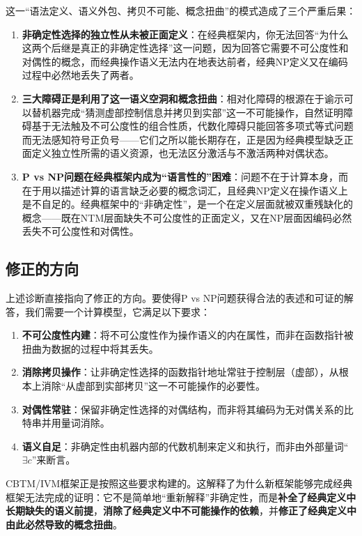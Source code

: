 \documentclass{ctexart}
\begin{document}
	这一``语法定义、语义外包、拷贝不可能、概念扭曲''的模式造成了三个严重后果：
	\begin{enumerate}
		\item \textbf{非确定性选择的独立性从未被正面定义}：在经典框架内，你无法回答``为什么这两个后继是真正的非确定性选择''这一问题，因为回答它需要不可公度性和对偶性的概念，而经典操作语义无法内在地表达前者，经典NP定义又在编码过程中必然地丢失了两者。
		\item \textbf{三大障碍正是利用了这一语义空洞和概念扭曲}：相对化障碍的根源在于谕示可以替机器完成“猜测虚部控制信息并拷贝到实部”这一不可能操作，自然证明障碍基于无法触及不可公度性的组合性质，代数化障碍只能回答多项式等式问题而无法感知符号正负号——它们之所以能长期存在，正是因为经典模型缺乏正面定义独立性所需的语义资源，也无法区分激活与不激活两种对偶状态。
		\item \textbf{P vs NP问题在经典框架内成为``语言性的''困难}：问题不在于计算本身，而在于用以描述计算的语言缺乏必要的概念词汇，且经典NP定义在操作语义上是不自足的。经典框架中的``非确定性''，是一个在定义层面就被双重残缺化的概念——既在NTM层面缺失不可公度性的正面定义，又在NP层面因编码必然丢失不可公度性和对偶性。
	\end{enumerate}
	
	\subsection{修正的方向}
	
	上述诊断直接指向了修正的方向。要使得P vs NP问题获得合法的表述和可证的解答，我们需要一个计算模型，它满足以下要求：
	\begin{enumerate}
		\item \textbf{不可公度性内建}：将不可公度性作为操作语义的内在属性，而非在函数指针被扭曲为数据的过程中将其丢失。
		\item \textbf{消除拷贝操作}：让非确定性选择的函数指针地址常驻于控制层（虚部），从根本上消除``从虚部到实部拷贝''这一不可能操作的必要性。
		\item \textbf{对偶性常驻}：保留非确定性选择的对偶结构，而非将其编码为无对偶关系的比特串并用量词消除。
		\item \textbf{语义自足}：非确定性由机器内部的代数机制来定义和执行，而非由外部量词``$\exists c$''来断言。
	\end{enumerate}
	
	CBTM/IVM框架正是按照这些要求构建的\cite{cbtmarxiv,rbtmarxiv}。这解释了为什么新框架能够完成经典框架无法完成的证明：它不是简单地``重新解释''非确定性，而是\textbf{补全了经典定义中长期缺失的语义前提}，\textbf{消除了经典定义中不可能操作的依赖}，并\textbf{修正了经典定义中由此必然导致的概念扭曲}。
	
\end{document}
